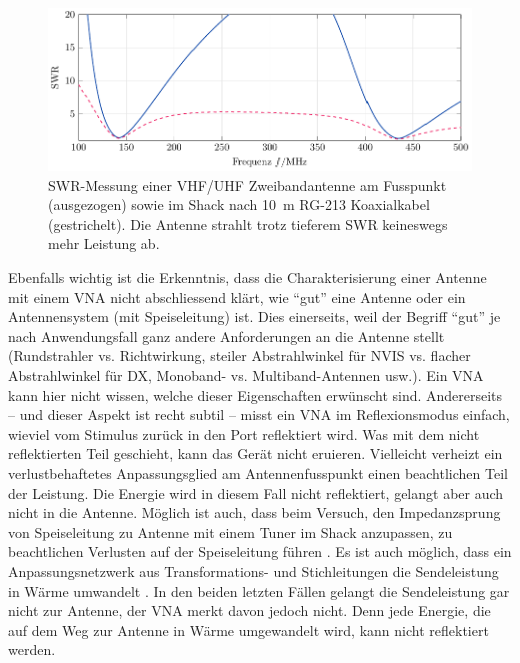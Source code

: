 \documentclass[twoside,a4paper,11pt,halfparskip,DIV=11,notitlepage]{scrartcl}
\begin{document}
\begin{figure}[H]
    \begin{center}\includegraphics{figures/feednofeed/feednofeed.pdf}\end{center}
    \caption{SWR-Messung einer VHF/UHF Zweibandantenne am Fusspunkt (ausgezogen) sowie im Shack nach 10~m
    RG-213 Koaxialkabel (gestrichelt). Die Antenne strahlt trotz tieferem SWR keineswegs mehr Leistung ab.}
    \label{fig:antenna_with_wo_feed}
\end{figure}

Ebenfalls wichtig ist die Erkenntnis, dass die Charakterisierung einer Antenne mit einem VNA
nicht abschliessend klärt, wie ``gut'' eine Antenne oder ein Antennensystem (mit Speiseleitung)
ist. Dies einerseits, weil der Begriff ``gut'' je nach Anwendungsfall ganz andere Anforderungen
an die Antenne stellt (Rundstrahler vs. Richtwirkung, steiler Abstrahlwinkel für NVIS vs.
flacher Abstrahlwinkel für DX, Monoband- vs. Multiband-Antennen usw.). Ein VNA
kann hier nicht wissen, welche dieser Eigenschaften erwünscht sind. Andererseits -- und dieser
Aspekt ist recht subtil -- misst ein VNA im Reflexionsmodus einfach, wieviel vom Stimulus
zurück in den Port reflektiert wird. Was mit dem nicht reflektierten Teil geschieht, kann
das Gerät nicht eruieren. Vielleicht verheizt ein verlustbehaftetes Anpassungsglied am
Antennenfusspunkt einen beachtlichen Teil der Leistung. Die Energie wird in diesem Fall nicht
reflektiert, gelangt aber auch nicht in die Antenne. Möglich ist auch, dass beim Versuch,
den Impedanzsprung von Speiseleitung zu Antenne mit einem Tuner im Shack anzupassen, zu
beachtlichen Verlusten auf der Speiseleitung führen \cite{walraven2006understanding}. Es ist
auch möglich, dass ein Anpassungsnetzwerk aus Transformations- und Stichleitungen die
Sendeleistung in Wärme umwandelt \cite{doberenz2019swrgut}. In den beiden letzten Fällen
gelangt die Sendeleistung gar nicht zur Antenne, der VNA merkt davon jedoch nicht. Denn
jede Energie, die auf dem Weg zur Antenne in Wärme umgewandelt wird, kann nicht reflektiert
werden.
\end{document}
